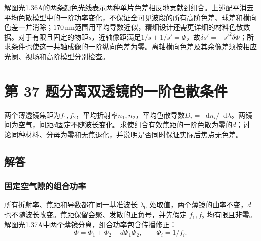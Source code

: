 \documentclass[UTF8,fontset=fandol,a4paper,11pt]{ctexart}
\newcommand{\dd}{\mathop{}\!\mathrm{d}}
\newcommand{\figcaption}[1]{\par\vspace{2pt}{\small\color{muted}#1}\par}
\begin{document}
解图光1.36A的两条颜色光线表示两种单片色差相反地贡献到组合。上述配平消去平均色散模型中的一阶功率变化，不保证全可见波段的所有高阶色差、球差和横向色差一并消除；$170\,\mathrm{nm}$范围用平均导数近似，精细设计还需更详细的材料色散数据。对于有限且固定的物距$s$，近轴像距满足$1/s+1/s'=\Phi$，故$\delta s'=-s'^2\delta\Phi$；所求条件也使这一共轴成像的一阶纵向色差为零。离轴横向色差及其余像差须按相应光阑、视场和高阶模型分别检查。



\section*{第 37 题\quad 分离双透镜的一阶色散条件}\label{q:37}

两个薄透镜焦距为$f_1,f_2$，平均折射率$n_1,n_2$，平均色散导数$D_i=\dd n_i/\dd\lambda$。两镜间为空气，间距$d$固定不随波长变化。求使组合有效焦距的一阶色散为零的$d$；讨论同种材料、分母为零和无焦退化，并说明是否同时保证实际后焦点无色差。

\begin{center}\begin{minipage}{.98\linewidth}\centering
{}
\figcaption{图光1.37\quad 两片薄透镜的材料参数与固定空气隙}
\end{minipage}\end{center}


\subsection*{解答}


\subsubsection*{固定空气隙的组合功率}
所有折射率、焦距和导数都在同一基准波长 $\lambda_0$ 处取值，两个薄镜的曲率不变，$d$ 也不随波长改变。焦距保留会聚、发散的正负号，并先假定 $f_1,f_2$ 均有限且非零。解图光1.37A中两个薄镜分离，组合功率包含传播修正：
\[
\Phi=\Phi_1+\Phi_2-d\Phi_1\Phi_2,
\qquad \Phi_i=1/f_i.
\]
\end{document}
